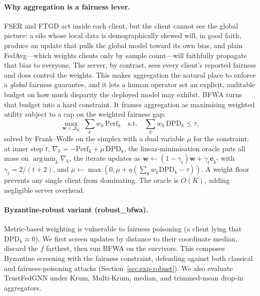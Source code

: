 \documentclass[pdflatex,sn-mathphys-num]{sn-jnl}
\theoremstyle{thmstyleone}%
\theoremstyle{thmstyletwo}%
\theoremstyle{thmstylethree}%
\newcommand{\dpd}{\mathrm{DPD}}
\DeclareMathOperator*{\argmin}{arg\,min}
\begin{document}
\paragraph{Why aggregation is a fairness lever.}
FSER and FTGD act inside each client, but the client cannot see the global
picture: a silo whose local data is demographically skewed will, in good faith,
produce an update that pulls the global model toward its own bias, and plain
FedAvg---which weights clients only by sample count---will faithfully propagate
that bias to everyone. The server, by contrast, sees every client's reported
fairness and does control the weights. This makes aggregation the natural place
to enforce a \emph{global} fairness guarantee, and it lets a human operator set
an explicit, auditable budget on how much disparity the deployed model may
exhibit. BFWA turns that budget into a hard constraint. It frames aggregation as
maximising weighted utility subject to a cap on the weighted fairness gap:
\begin{equation}
\max_{\mathbf{w}\in\Delta_K}\ \textstyle\sum_k w_k\,\mathrm{Perf}_k
\quad\text{s.t.}\quad \textstyle\sum_k w_k\,\dpd_k\le\tau,
\end{equation}
solved by Frank--Wolfe on the simplex with a dual variable $\mu$ for the
constraint: at inner step $t$, $\nabla_k=-\mathrm{Perf}_k+\mu\,\dpd_k$, the
linear-minimisation oracle puts all mass on $\argmin_k\nabla_k$, the iterate
updates as $\mathbf{w}\!\leftarrow\!(1-\gamma_t)\mathbf{w}+\gamma_t\mathbf{e}_{k^*}$
with $\gamma_t=2/(t+2)$, and $\mu\!\leftarrow\!\max(0,\mu+\eta(\sum_k w_k\dpd_k-\tau))$.
A weight floor prevents any single client from dominating. The oracle is $O(K)$,
adding negligible server overhead.

\paragraph{Byzantine-robust variant (robust\_bfwa).}
Metric-based weighting is vulnerable to fairness poisoning (a client lying that
$\dpd_k\!\approx\!0$). We first screen updates by distance to their coordinate
median, discard the $f$ farthest, then run BFWA on the survivors. This composes
Byzantine screening with the fairness constraint, defending against both
classical and fairness-poisoning attacks (Section~\ref{sec:exp-robust}). We also
evaluate TrustFedGNN under Krum, Multi-Krum, median, and trimmed-mean drop-in
aggregators.
\end{document}
